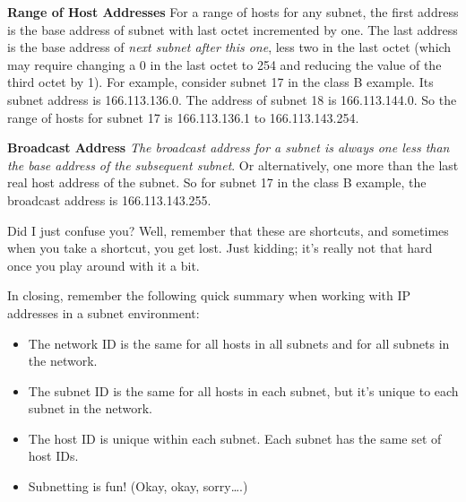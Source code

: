 {\textbf{Range of Host Addresses}} For a range of hosts for any subnet,
the first address is the base address of subnet with last octet
incremented by one. The last address is the base address of {\emph{next
subnet after this one}}, less two in the last octet (which may require
changing a 0 in the last octet to 254 and reducing the value of the
third octet by 1). For example, consider subnet 17 in the class B
example. Its subnet address is 166.113.136.0. The address of subnet 18
is 166.113.144.0. So the range of hosts for subnet 17 is 166.113.136.1
to 166.113.143.254.

{\textbf{Broadcast Address}} {\emph{The broadcast address for a subnet
is always one less than the base address of the subsequent subnet}}. Or
alternatively, one more than the last real host address of the subnet.
So for subnet 17 in the class B example, the broadcast address is
166.113.143.255.

Did I just confuse you? Well, remember that these are shortcuts, and
sometimes when you take a shortcut, you get lost. Just kidding; it's
really not that hard once you play around with it a bit.

In closing, remember the following quick summary when working with IP
addresses in a subnet environment:

\begin{itemize}
\item
  The network ID is the same for all hosts in all subnets and for all
  subnets in the network.
\item
  The subnet ID is the same for all hosts in each subnet, but it's
  unique to each subnet in the network.
\item
  The host ID is unique within each subnet. Each subnet has the same set
  of host IDs.
\item
  Subnetting is fun! (Okay, okay, sorry\ldots.)
\end{itemize}
